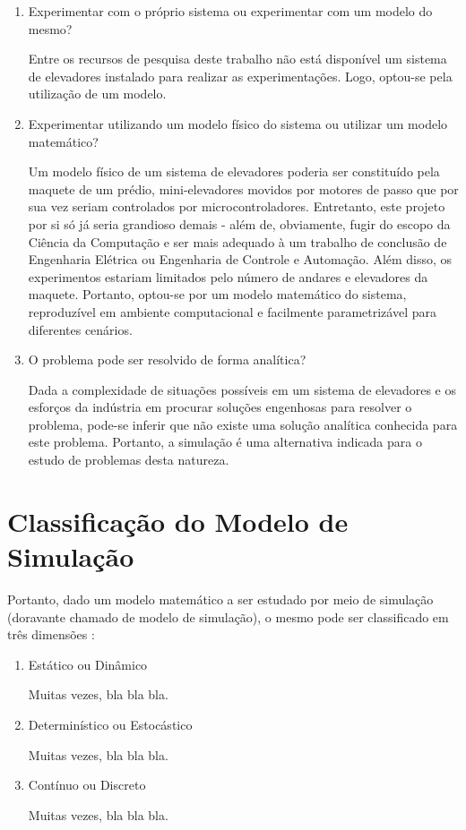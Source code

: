 \begin{enumerate}
\item Experimentar com o próprio sistema ou experimentar com um modelo do mesmo?

Entre os recursos de pesquisa deste trabalho não está disponível um sistema de
elevadores instalado para realizar as experimentações. Logo, optou-se pela
utilização de um modelo.

\item Experimentar utilizando um modelo físico do sistema ou utilizar um modelo
matemático?

Um modelo físico de um sistema de elevadores poderia ser constituído pela
maquete de um prédio, mini-elevadores movidos por motores de passo que por sua
vez seriam controlados por microcontroladores. Entretanto, este projeto por si
só já seria grandioso demais - além de, obviamente, fugir do escopo da Ciência
da Computação e ser mais adequado à um trabalho de conclusão de Engenharia
Elétrica ou Engenharia de Controle e Automação. Além disso, os experimentos
estariam limitados pelo número de andares e elevadores da maquete. Portanto,
optou-se por um modelo matemático do sistema, reproduzível em ambiente
computacional e facilmente parametrizável para diferentes cenários.

\item O problema pode ser resolvido de forma analítica?

Dada a complexidade de situações possíveis em um sistema de elevadores e os
esforços da indústria em procurar soluções engenhosas para resolver o problema,
pode-se inferir que não existe uma solução analítica conhecida para este
problema. Portanto, a simulação é uma alternativa indicada para o estudo de
problemas desta natureza.

\end{enumerate}

\section{Classificação do Modelo de Simulação}

Portanto, dado um modelo matemático a ser estudado por meio de simulação
(doravante chamado de modelo de simulação), o mesmo pode ser classificado em
três dimensões \cite{Banks,Law}:

\begin{enumerate}
\item Estático ou Dinâmico

Muitas vezes, bla bla bla.
\item Determinístico ou Estocástico

Muitas vezes, bla bla bla.
\item Contínuo ou Discreto

Muitas vezes, bla bla bla.
\end{enumerate}
